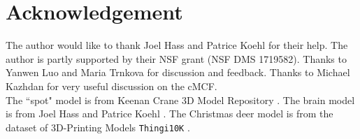 \documentclass[11pt]{amsart}
\begin{document}
\section{Acknowledgement} 
The author would like to thank Joel Hass and Patrice Koehl for their help. The author is partly supported by their NSF grant (NSF DMS 1719582). Thanks to Yanwen Luo and Maria Trnkova for discussion and feedback. Thanks to Michael Kazhdan for very useful discussion on the cMCF.\\
The ``spot" model is from Keenan Crane 3D Model Repository \cite{keenan}. The brain model is from Joel Hass and Patrice Koehl \cite{hk1}. The Christmas deer model is from the dataset of 3D-Printing Models \texttt{Thingi10K} \cite{thingi10k}.



\end{document}

